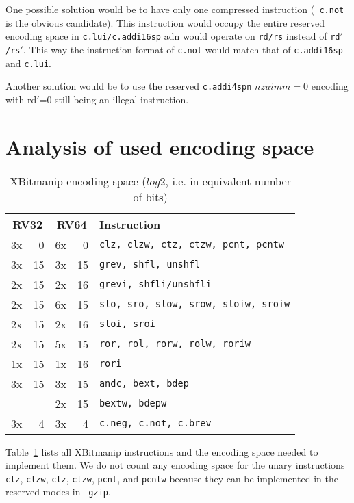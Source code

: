 One possible solution would be to have only one compressed instruction ({\tt
c.not} is the obvious candidate). This instruction would occupy the entire
reserved encoding space in {\tt c.lui/c.addi16sp} adn would operate on {\tt rd/rs}
instead of {\tt rd$'$/rs$'$}. This way the instruction format of {\tt c.not}
would match that of {\tt c.addi16sp} and {\tt c.lui}.

Another solution would be to use the reserved {\tt c.addi4spn} $nzuimm=0$ encoding
with rd$'$=0 still being an illegal instruction.

\section{Analysis of used encoding space}

\begin{table}
\begin{center}
\begin{tabular}{rr|rr|l}
\multicolumn{2}{c|}{RV32} & \multicolumn{2}{c|}{RV64} & Instruction \\
\hline
3x &  0 & 6x &  0 & {\tt clz, clzw, ctz, ctzw, pcnt, pcntw} \\
\hline
3x & 15 & 3x & 15 & {\tt grev, shfl, unshfl} \\
2x & 15 & 2x & 16 & {\tt grevi, shfli/unshfli} \\
\hline
2x & 15 & 6x & 15 & {\tt slo, sro, slow, srow, sloiw, sroiw} \\
2x & 15 & 2x & 16 & {\tt sloi, sroi} \\
\hline
2x & 15 & 5x & 15 & {\tt ror, rol, rorw, rolw, roriw} \\
1x & 15 & 1x & 16 & {\tt rori} \\
\hline
3x & 15 & 3x & 15 & {\tt andc, bext, bdep} \\
   &    & 2x & 15 & {\tt bextw, bdepw} \\
\hline
3x &  4 & 3x &  4 & {\tt c.neg, c.not, c.brev} \\
\end{tabular}
\end{center}
\caption{XBitmanip encoding space ($log2$, i.e. in equivalent number of bits)}
\label{encspace-tab}
\end{table}

Table~\ref{encspace-tab} lists all XBitmanip instructions and the encoding
space needed to implement them.  We do not count any encoding space for the
unary instructions {\tt clz}, {\tt clzw}, {\tt ctz}, {\tt ctzw}, {\tt pcnt},
and {\tt pcntw} because they can be implemented in the reserved modes in {\tt
gzip}.


